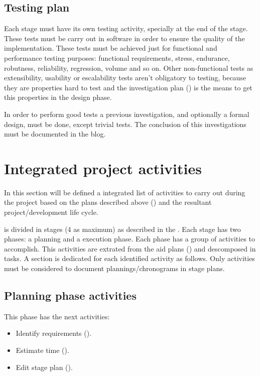 \documentclass[twocolumn]{article}
\begin{document}
\subsection{Testing plan}
\label{ssec:testing-plan}
Each stage must have its own testing activity, specially at the end of
the stage. These tests must be carry out in software in order to
ensure the quality of the implementation. These tests must be achieved
just for functional and performance testing purposes:
functional requirements, stress, endurance,
robutness, reliability, regression, volume and so on. Other
non-functional tests as extensibility, usability or escalability tests
aren't obligatory to testing, because they are properties hard to test
and the investigation plan () is the
means to get this properties in the design phase.

In order to perform good tests a previous investigation, and
optionally a formal design, must be done, except trivial tests. The
conclusion of this investigations must be documented in the \fav
blog.

\section{Integrated project activities}
\label{sec:integrated-activities}
In this section will be defined a integrated list of activities to
carry out during the project based on the plans described above
() and the resultant project/development life
cycle.

\favp is divided in stages (4 as maximum) as described in the
\favc. Each stage has two phases: a planning and a execution
phase. Each phase has a group of activities to
accomplish. This activities are extrated from the aid plans
() and descomposed in tasks. A section is
dedicated for each identified activity as follows. Only activities
must be considered to document plannings/chronograms in stage plans.

\subsection{Planning phase activities}
\label{ssec:planning-phase}
This phase has the next activities:

\begin{itemize}
\item Identify requirements ().
\item Estimate time ().
\item Edit stage plan ().
\end{itemize}
\end{document}
